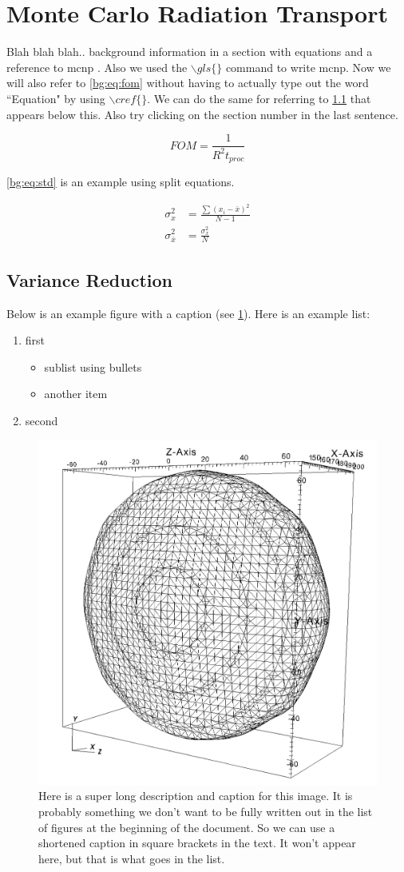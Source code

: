 \section{Monte Carlo Radiation Transport}
\label{sec:bg:mc}

Blah blah blah.. background information in a section with equations and a reference to \gls{mcnp} \cite{mcnp5-theory}.
Also we used the $\backslash gls \{ \}$ command to write \gls{mcnp}.
Now we will also refer to \cref{bg:eq:fom} without having to actually type out the word ``Equation" by using $\backslash cref \{ \}$.
We can do the same for referring to \cref{sec:bg:vr} that appears below this.
Also try clicking on the section number in the last sentence.

\begin{equation}\label{bg:eq:fom}
	FOM = \frac{1}{R^2 t_{proc}}
\end{equation}

\cref{bg:eq:std} is an example using split equations.

\begin{equation}\label{bg:eq:std}
\begin{split}
	\sigma_x^2 &= \frac{\sum \left(x_i - \bar{x}\right)^2}{N-1} \\
	\sigma_{\bar{x}}^2 &= \frac{\sigma_x^2}{N}
\end{split}
\end{equation}

\subsection{Variance Reduction}
\label{sec:bg:vr}

Below is an example figure with a caption (see \cref{fig:bg:example-fig}).
Here is an example list:
\begin{enumerate}
	\item first
		\begin{itemize}
			\item sublist using bullets
			\item another item
		\end{itemize}
	\item second
\end{enumerate}

\begin{figure}[h!]
\centering
	\includegraphics[width=.3\textwidth]{./content/background/example-isosurf.png}
	\caption[Example short figure caption]{Here is a super long description and caption for this image. It is probably something we don't want to be fully written out in the list of figures at the beginning of the document. So we can use a shortened caption in square brackets in the text. It won't appear here, but that is what goes in the list.
	\label{fig:bg:example-fig}}
\end{figure}

